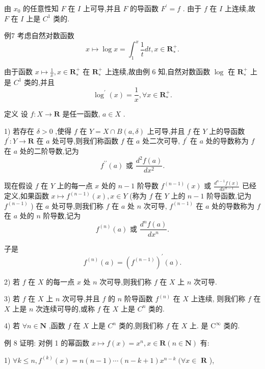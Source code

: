 由 ${x}_{0}$ 的任意性知 $F$ 在 $I$ 上可导,并且 $F$ 的导函数 ${F}^{\prime } = f$ . 由于 $f$ 在 $I$ 上连续,故 $F$ 在 $I$ 上是 ${C}^{1}$ 类的.

例7 考虑自然对数函数
$$x \mapsto  \log x = {\int }_{1}^{x}\frac{1}{t}{dt},x \in  {\mathbf{R}}_{ * }^{ + }.$$

由于函数 $x \mapsto  \frac{1}{x},x \in  {\mathbf{R}}_{ * }^{ + }$ 在 ${\mathbf{R}}_{ * }^{ + }$ 上连续,故由例 6 知,自然对数函数 $\log$ 在 ${\mathbf{R}}_{ * }^{ + }$ 上是 ${C}^{1}$ 类的,并且
$${\log }^{\prime }\left( x\right)  = \frac{1}{x},\forall x \in  {\mathbf{R}}_{ * }^{ + }.$$

定义 设 $f : X \rightarrow  \mathbf{R}$ 是任一函数, $a \in  X$ .

1) 若存在 $\delta  > 0$ ,使得 $f$ 在 $Y = X \cap  B\left( {a,\delta }\right)$ 上可导,并且 $f$ 在 $Y$ 上的导函数 ${f}^{\prime } : Y \rightarrow  \mathbf{R}$ 在 $a$ 处可导,则我们称函数 $f$ 在 $a$ 处二次可导, ${f}^{\prime }$ 在 $a$ 处的导数称为 $f$ 在 $a$ 处的二阶导数,记为
$${f}^{\prime \prime }\left( a\right) \text{ 或 }\frac{{d}^{2}f\left( a\right) }{d{x}^{2}}.$$

现在假设 $f$ 在 $Y$ 上的每一点 $x$ 处的 $n - 1$ 阶导数 ${f}^{\left( n - 1\right) }\left( x\right)$ 或 $\frac{{d}^{n - 1}f\left( x\right) }{d{x}^{n - 1}}$ 已经定义,如果函数 $x \mapsto  {f}^{\left( n - 1\right) }\left( x\right) ,x \in  Y$ (称为 $f$ 在 $Y$ 上的 $n - 1$ 阶导函数,记为 ${f}^{\left( n - 1\right) }$ ) 在 $a$ 处可导,则我们称 $f$ 在 $a$ 处 $n$ 次可导, ${f}^{\left( n - 1\right) }$ 在 $a$ 处的导数称为 $f$ 在 $a$ 处的 $n$ 阶导数,记为
$${f}^{\left( n\right) }\left( a\right) \text{ 或 }\frac{{d}^{n}f\left( a\right) }{d{x}^{n}}.$$

子是
$${f}^{\left( n\right) }\left( a\right)  = {\left( {f}^{\left( n - 1\right) }\right) }^{\prime }\left( a\right) .$$

2) 若 $f$ 在 $X$ 的每一点 $x$ 处 $n$ 次可导,则我们称 $f$ 在 $X$ 上 $n$ 次可导.

3) 若 $f$ 在 $X$ 上 $n$ 次可导,并且 $f$ 的 $n$ 阶导函数 ${f}^{\left( n\right) }$ 在 $X$ 上连续, 则我们称 $f$ 在 $X$ 上是 $n$ 次连续可导的,或称 $f$ 在 $X$ 上是 ${C}^{n}$ 类的.

4) 若 $\forall n \in  \mathbf{N}$ ,函数 $f$ 在 $X$ 上是 ${C}^{n}$ 类的,则我们称 $f$ 在 $X$ 上. 是 ${\mathrm{C}}^{\infty }$ 类的.

例 8 证明: 对例 1 的幂函数 $x \mapsto  f\left( x\right)  = {x}^{n},x \in  \mathbf{R}\left( {n \in  \mathbf{N}}\right)$ 有:

1) $\forall k \leq  n,{f}^{\left( k\right) }\left( x\right)  = n\left( {n - 1}\right) \cdots \left( {n - k + 1}\right) {x}^{n - k}\;(\forall x \in$  $\mathbf{R}$ ),

